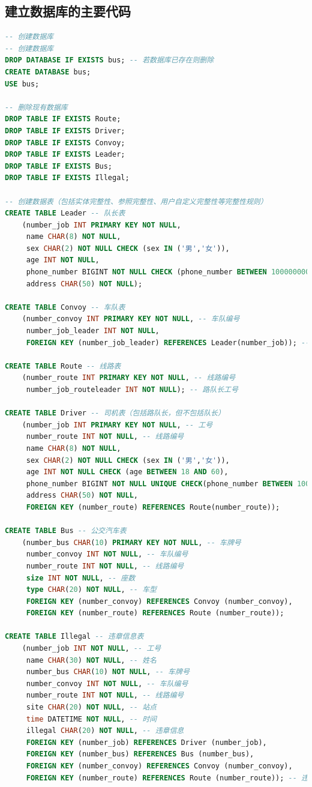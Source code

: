 \documentclass {article}
\begin{document}
		\subsection{建立数据库的主要代码}
			\begin{lstlisting}[language=SQL]
-- 创建数据库
-- 创建数据库
DROP DATABASE IF EXISTS bus; -- 若数据库已存在则删除
CREATE DATABASE bus;
USE bus;

-- 删除现有数据库
DROP TABLE IF EXISTS Route;
DROP TABLE IF EXISTS Driver;
DROP TABLE IF EXISTS Convoy;
DROP TABLE IF EXISTS Leader;
DROP TABLE IF EXISTS Bus;
DROP TABLE IF EXISTS Illegal;

-- 创建数据表（包括实体完整性、参照完整性、用户自定义完整性等完整性规则）
CREATE TABLE Leader -- 队长表
    (number_job INT PRIMARY KEY NOT NULL,
     name CHAR(8) NOT NULL,
     sex CHAR(2) NOT NULL CHECK (sex IN ('男','女')),
     age INT NOT NULL,
     phone_number BIGINT NOT NULL CHECK (phone_number BETWEEN 10000000000 AND 99999999999) UNIQUE,
     address CHAR(50) NOT NULL);

CREATE TABLE Convoy -- 车队表
    (number_convoy INT PRIMARY KEY NOT NULL, -- 车队编号
     number_job_leader INT NOT NULL,
     FOREIGN KEY (number_job_leader) REFERENCES Leader(number_job)); -- 队长工号

CREATE TABLE Route -- 线路表
    (number_route INT PRIMARY KEY NOT NULL, -- 线路编号
     number_job_routeleader INT NOT NULL); -- 路队长工号

CREATE TABLE Driver -- 司机表（包括路队长，但不包括队长）
    (number_job INT PRIMARY KEY NOT NULL, -- 工号
     number_route INT NOT NULL, -- 线路编号
     name CHAR(8) NOT NULL,
     sex CHAR(2) NOT NULL CHECK (sex IN ('男','女')),
     age INT NOT NULL CHECK (age BETWEEN 18 AND 60),
     phone_number BIGINT NOT NULL UNIQUE CHECK(phone_number BETWEEN 10000000000 AND 99999999999),
     address CHAR(50) NOT NULL,
     FOREIGN KEY (number_route) REFERENCES Route(number_route));

CREATE TABLE Bus -- 公交汽车表
    (number_bus CHAR(10) PRIMARY KEY NOT NULL, -- 车牌号
     number_convoy INT NOT NULL, -- 车队编号
     number_route INT NOT NULL, -- 线路编号
     size INT NOT NULL, -- 座数
     type CHAR(20) NOT NULL, -- 车型
     FOREIGN KEY (number_convoy) REFERENCES Convoy (number_convoy),
     FOREIGN KEY (number_route) REFERENCES Route (number_route));

CREATE TABLE Illegal -- 违章信息表
    (number_job INT NOT NULL, -- 工号
     name CHAR(30) NOT NULL, -- 姓名
     number_bus CHAR(10) NOT NULL, -- 车牌号
     number_convoy INT NOT NULL, -- 车队编号
     number_route INT NOT NULL, -- 线路编号
     site CHAR(20) NOT NULL, -- 站点
     time DATETIME NOT NULL, -- 时间
     illegal CHAR(20) NOT NULL, -- 违章信息
     FOREIGN KEY (number_job) REFERENCES Driver (number_job),
     FOREIGN KEY (number_bus) REFERENCES Bus (number_bus),
     FOREIGN KEY (number_convoy) REFERENCES Convoy (number_convoy),
     FOREIGN KEY (number_route) REFERENCES Route (number_route)); -- 违章表


\end{lstlisting}
\end{document}
